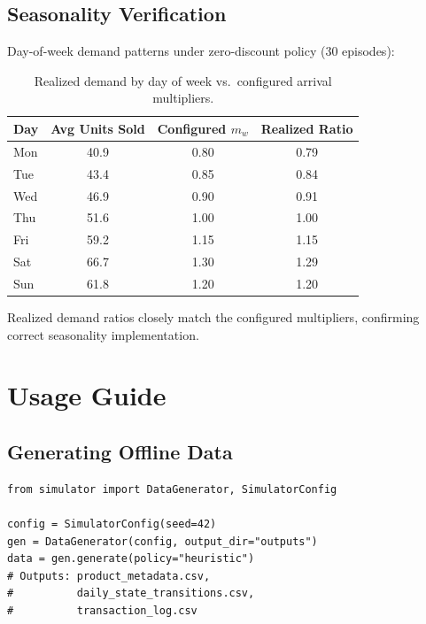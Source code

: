 \documentclass[11pt,a4paper]{article}
\begin{document}
\subsection{Seasonality Verification}

Day-of-week demand patterns under zero-discount policy (30 episodes):
\begin{table}[H]
\centering
\caption{Realized demand by day of week vs.\ configured arrival multipliers.}
\begin{tabular}{@{}lccc@{}}
\toprule
\textbf{Day} & \textbf{Avg Units Sold} & \textbf{Configured $m_w$} & \textbf{Realized Ratio} \\
\midrule
Mon & 40.9 & 0.80 & 0.79 \\
Tue & 43.4 & 0.85 & 0.84 \\
Wed & 46.9 & 0.90 & 0.91 \\
Thu & 51.6 & 1.00 & 1.00 \\
Fri & 59.2 & 1.15 & 1.15 \\
Sat & 66.7 & 1.30 & 1.29 \\
Sun & 61.8 & 1.20 & 1.20 \\
\bottomrule
\end{tabular}
\end{table}
Realized demand ratios closely match the configured multipliers, confirming correct seasonality implementation.

\section{Usage Guide}
\label{sec:usage}

\subsection{Generating Offline Data}

\begin{lstlisting}[caption={Generating CSV datasets for offline pre-training.}]
from simulator import DataGenerator, SimulatorConfig

config = SimulatorConfig(seed=42)
gen = DataGenerator(config, output_dir="outputs")
data = gen.generate(policy="heuristic")
# Outputs: product_metadata.csv,
#          daily_state_transitions.csv,
#          transaction_log.csv
\end{lstlisting}
\end{document}

